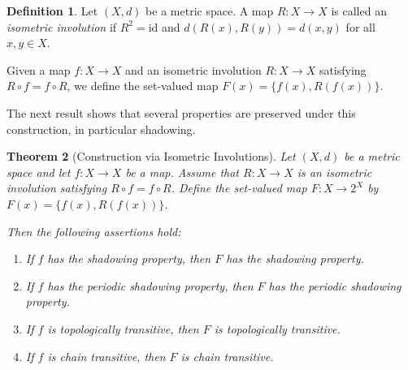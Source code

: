 \documentclass{amsart}
\newtheorem{theorem}{Theorem}[section]
\theoremstyle{definition}
\newtheorem{definition}[theorem]{Definition}
\begin{document}
\begin{definition}
Let $(X,d)$ be a metric space. A map $R:X\to X$ is called an \emph{isometric involution} if $
R^2=\mathrm{id}$ and $
d(R(x),R(y))=d(x,y)$ for all $x,y\in X$.
\end{definition}

Given a map $f:X\to X$ and an isometric involution $R:X\to X$ satisfying $
R\circ f=f\circ R$, we define the set-valued map $F(x)=\{f(x),R(f(x))\}$.

The next result shows that several properties are preserved under this construction, in particular shadowing.

\begin{theorem}[Construction via Isometric Involutions]
\label{thm:involution}
Let $(X,d)$ be a metric space and let $f:X\to X$ be a map. Assume that $R:X\to X$ is an isometric involution satisfying $
R\circ f=f\circ R$.
Define the set-valued map $F:X\to 2^X$ by $F(x)=\{f(x),R(f(x))\}$.

Then the following assertions hold:

\begin{enumerate}
    \item If $f$ has the shadowing property, then $F$ has the shadowing property.

    \item If $f$ has the periodic shadowing property, then $F$ has the periodic shadowing property.

    \item If $f$ is topologically transitive, then $F$ is topologically transitive.

    \item If $f$ is chain transitive, then $F$ is chain transitive.
\end{enumerate}
\end{theorem}
\end{document}
